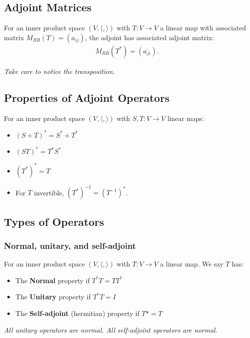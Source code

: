\documentclass[a4paper, 12pt, twoside]{article}
\begin{document}
\subsection{Adjoint Matrices}

For an inner product space $(V, \langle , \rangle)$ with 
$T : V \to V$ a linear map with associated matrix 
$M_{BB}(T) = (a_{ij})$, the adjoint has associated adjoint matrix:
\begin{align*}
  M_{BB}(T^*) = (\overline{a_{ji}}).
\end{align*}

\textit{Take care to notice the transposition.}

\subsection{Properties of Adjoint Operators}

For an inner product space $(V, \langle , \rangle)$ with 
$S, T : V \to V$ linear maps:
\begin{itemize}
  \item $(S + T)^* = S^* + T^*$
  \item $(ST)^* = T^*S^*$
  \item $(T^*)^* = T$
  \item For $T$ invertible, $(T^*)^{-1} = (T^{-1})^*$.
\end{itemize}

\subsection{Types of Operators}

\subsubsection{Normal, unitary, and self-adjoint}

For an inner product space $(V, \langle , \rangle)$ with 
$T : V \to V$ a linear map. We say $T$ has:
\begin{itemize}
  \item The \textbf{Normal} property if $T^*T = TT^*$
  \item The \textbf{Unitary} property if $T^*T = I$
  \item The \textbf{Self-adjoint} (hermitian) property if $T* = T$
\end{itemize}

\textit{All unitary operators are normal. All self-adjoint operators
are normal.}
\end{document}
